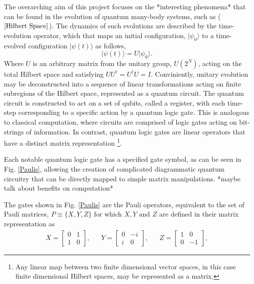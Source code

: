 The overarching aim of this project focuses on the *interesting phenomena*
that can be found in the evolution of quantum many-body systems, such as ($\refeq{Hilbert Space}$). The dynamics of such evolutions are described by the time-evolution operator, which that maps an initial configuration, $|\psi_0\rangle $ to a time-evolved configuration $|\psi(t)\rangle$ as follows, 
\begin{equation}
    |\psi (t)\rangle = U |\psi_0\rangle. 
\end{equation}
Where $U$ is an arbitrary matrix from the unitary group, $U(2^N)$, acting on the total Hilbert space and satisfying $UU^{\dagger} = U^{\dagger}U = I$. 
Conviniently, unitary evolution may be deconstructed into a sequence of linear transformations acting on finite subregions of the Hilbert space, represented as a quantum circuit.
The quantum circuit is constructed to act on a set of qubits, called a register, with each time-step corresponding to a specific action by a quantum logic gate.  
This is analogous to classical computation, where circuits are comprised of logic gates acting on bit-strings of information. 
In contrast, quantum logic gates are linear operators that have a distinct matrix representation \footnote{Any linear map between two finite dimensional vector spaces, in this case finite dimensional Hilbert spaces, may be represented as a matrix. }.  

Each notable quantum logic gate has a specified gate symbol, as can be seen in Fig. \ref{Paulis}, allowing the creation of complicated diagrammatic quantum circuitry that can be directly
mapped to simple matrix manipulations. *maybe talk about benefits on computation*



The gates shown in Fig. \ref{Paulis} are  the Pauli operators, equivalent
to the set of Pauli matrices, $P \equiv \{X, Y, Z\}$ for which $X, Y \text{ and } Z$ are defined in their matrix representation as
\begin{align}
    \label{PauliMatrices}
    X = \begin{bmatrix}
            0 & 1 \\
            1 & 0
        \end{bmatrix},
     &  &
    Y = \begin{bmatrix}
            0  & -i \\
            i & 0
        \end{bmatrix},
     &  &
    Z = \begin{bmatrix}
            1 & 0  \\
            0 & -1
        \end{bmatrix},
\end{align}

